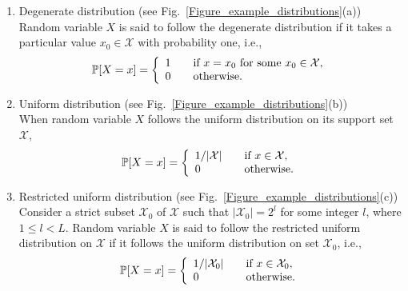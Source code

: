 \documentclass[10pt,journal]{IEEEtran}
\def \Fig {Fig.}
\begin{document}
\begin{enumerate}[(1)]
%  
\item Degenerate distribution (see \Fig~\ref{Figure_example_distributions}(a))\\
% 
Random variable $X$ is said to follow the degenerate distribution if it takes a particular value $x_0 \in \mathcal{X}$ 
with probability one, i.e., 
% 
% 
\begin{align}
% 
\mathbb{P}[X = x] = \left\{
			\begin{array}{l l}
			    1 & \quad \text{if } x = x_0 \text{ for some }x_0 \in \mathcal{X}, \\
			    0 & \quad \text{otherwise}.
			\end{array} 
		  \right.
\label{Eqn_type_1_distri}
% 
\end{align}
% 
\item Uniform distribution (see \Fig~\ref{Figure_example_distributions}(b)) \\
% 
When random variable $X$ follows the uniform distribution on its support set $\mathcal{X}$, 
% 
\begin{align}
% 
\mathbb{P}[X = x] = \left\{
			\begin{array}{l l}
			    1/|\mathcal{X}| & \quad \text{if } x \in \mathcal{X}, \\
			    0 & \quad \text{otherwise}.
			\end{array} 
		  \right.
\label{Eqn_type_2_distri}		  
% 
\end{align}
% 


\item Restricted uniform distribution (see \Fig~\ref{Figure_example_distributions}(c)) \\
% 
Consider a strict subset $\mathcal{X}_0$ of $\mathcal{X}$ such that $|\mathcal{X}_0| = 2^l$ for some integer $l$, where $1 \leq l < L$.
Random variable $X$ is said to follow the restricted uniform distribution on $\mathcal{X}$ if it follows 
the uniform distribution on set $\mathcal{X}_0$, i.e., 
% 
% 
\begin{align}
% 
\mathbb{P}[X = x] = \left\{
			\begin{array}{l l}
			    1/|\mathcal{X}_0| & \quad \text{if } x \in \mathcal{X}_0, \\
			    0 & \quad \text{otherwise}.
			\end{array} 
		  \right.
\label{Eqn_type_3_distri}		  
% 
\end{align}
% 
\end{enumerate}
% 
\end{document}
